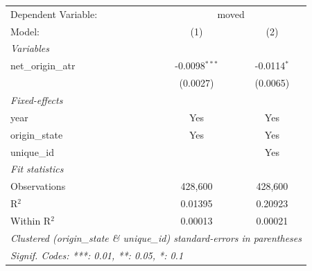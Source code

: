 
\begingroup
\centering
\small
\begin{tabular}{lcc}
   \tabularnewline \midrule \midrule
   Dependent Variable: & \multicolumn{2}{c}{moved}\\
   Model:             & (1)             & (2)\\  
   \midrule
   \emph{Variables}\\
   net\_origin\_atr   & -0.0098$^{***}$ & -0.0114$^{*}$\\   
                      & (0.0027)        & (0.0065)\\   
   \midrule
   \emph{Fixed-effects}\\
   year               & Yes             & Yes\\  
   origin\_state      & Yes             & Yes\\  
   unique\_id         &                 & Yes\\  
   \midrule
   \emph{Fit statistics}\\
   Observations       & 428,600         & 428,600\\  
   R$^2$              & 0.01395         & 0.20923\\  
   Within R$^2$       & 0.00013         & 0.00021\\  
   \midrule \midrule
   \multicolumn{3}{l}{\emph{Clustered (origin\_state \& unique\_id) standard-errors in parentheses}}\\
   \multicolumn{3}{l}{\emph{Signif. Codes: ***: 0.01, **: 0.05, *: 0.1}}\\
\end{tabular}
\par\endgroup



